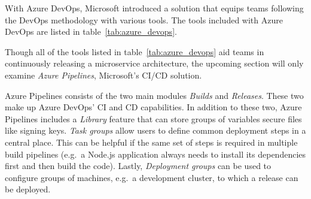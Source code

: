 With Azure DevOps, Microsoft introduced a solution that equips teams following
the DevOps methodology with various tools. The tools included with Azure DevOps
are listed in table~\ref{tab:azure_devops}.


Though all of the tools listed in table~\ref{tab:azure_devops} aid teams in
continuously releasing a microservice architecture, the upcoming section will
only examine \textit{Azure Pipelines}, Microsoft's \ac{CI}/\ac{CD} solution. 

Azure Pipelines consists of the two main modules \textit{Builds} and
\textit{Releases}. These two make up Azure DevOps' \ac{CI} and \ac{CD}
capabilities. In addition to these two, Azure Pipelines includes a
\textit{Library} feature that can store groups of variables secure files like
signing keys. \textit{Task groups} allow users to define common deployment
steps in a central place. This can be helpful if the same set of steps is
required in multiple build pipelines (e.g.\ a Node.js application always needs
to install its dependencies first and then build the code). Lastly,
\textit{Deployment groups} can be used to configure groups of machines, e.g.\ a
development cluster, to which a release can be deployed.
